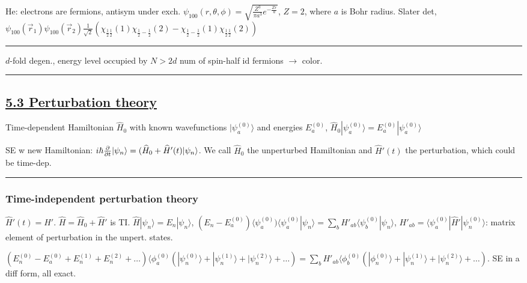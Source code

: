 \tiny
He: electrons are fermions, antisym under exch. $\psi_{100}(r, \theta, \phi) = \sqrt{\frac{Z^3}{\pi a^3} e^{-\frac{Zr}{a}}}$, $Z=2$, where $a$ is Bohr radius. Slater det, $\psi_{100}(\vec{r}_1) \psi_{100}(\vec{r}_2) \frac{1}{\sqrt{2}} (\chi_{\frac{1}{2} \frac{1}{2}} (1) \chi_{\frac{1}{2} -\frac{1}{2}} (2) - \chi_{\frac{1}{2} -\frac{1}{2}}(1) \chi_{\frac{1}{2} \frac{1}{2}} (2))$

\scriptsize

\hrule height 0.07pt

$d$-fold degen., energy level occupied by $N > 2d$ num of spin-half id fermions $\rightarrow$ color.

\hrule height 0.07pt

\subsection{\underline{5.3 Perturbation theory}}

Time-dependent Hamiltonian $\widehat{H}_0$ with known wavefunctions $|\psi_a^{(0)}\rangle$ and energies $E_a^{(0)}$, $\widehat{H}_0 |\psi_a^{(0)} \rangle = E_a^{(0)} | \psi_a^{(0)} \rangle$

SE w new Hamiltonian: $i \hbar \pdv{}{t} | \psi_n \rangle = (\widehat{H}_0 + \widehat{H}'(t) | \psi_n \rangle$. We call $\widehat{H}_0$ the unperturbed Hamiltonian and $\widehat{H}'(t)$ the perturbation, which could be time-dep.

\hrule height 0.07pt

\subsubsection{Time-independent perturbation theory}

$\widehat{H}'(t) = \widehat{H}'$. $\widehat{H} = \widehat{H}_0 + \widehat{H}'$ is TI. $\widehat{H} |\psi_n \rangle = E_n | \psi_n \rangle$, $(E_n - E_a^{(0)}) \langle \psi_a^{(0)}) \langle \psi_a^{(0)} | \psi_n \rangle = \sum_b H'_{ab} \langle \psi_b^{(0)} | \psi_n \rangle$, $H'_{ab} = \langle \psi_a^{(0)} | \widehat{H}' | \psi_n^{(0)} \rangle$: matrix element of perturbation in the unpert. states.

$(E_n^{(0)} - E_a^{(0)} + E_n^{(1)} + E_n^{(2)} + \dots) \langle \phi_a^{(0)} (|\psi_n^{(0)} \rangle + | \psi_n^{(1)}\rangle + | \psi_n^{(2)} \rangle + \dots) = \sum_b H'_{ab} \langle \phi_b^{(0)} (| \phi_n^{(0)} \rangle + | \psi_n^{(1)} \rangle + |\psi_n^{(2)} \rangle + \dots)$. SE in a diff form, all exact.

